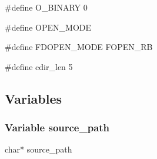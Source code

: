 {\stt \#define O\_BINARY 0}

\medskip
{\stt \#define OPEN\_MODE}

\medskip
{\stt \#define FDOPEN\_MODE FOPEN\_RB}

\medskip
{\stt \#define cdir\_len 5}


\subsection{Variables}


\subsubsection{Variable source\_path}
\label{var_source_path_source.c}

{\stt char* source\_path}


